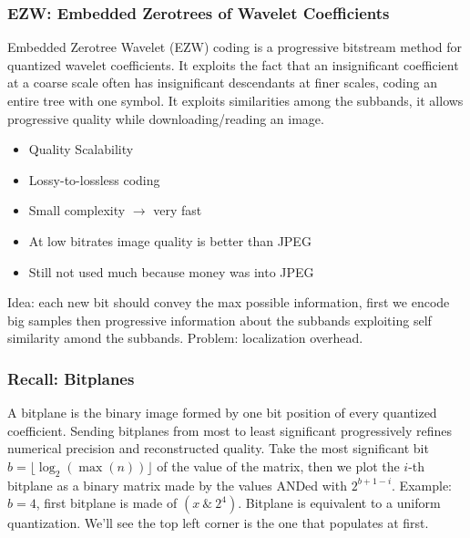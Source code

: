 \subsubsection{EZW: Embedded Zerotrees of Wavelet Coefficients}
Embedded Zerotree Wavelet (EZW) coding is a progressive bitstream method for quantized wavelet coefficients. It exploits the fact that an insignificant coefficient at a coarse scale often has insignificant descendants at finer scales, coding an entire tree with one symbol.
It exploits similarities among the subbands, it allows progressive quality while downloading/reading an image.
\begin{itemize}
    \item Quality Scalability
    \item Lossy-to-lossless coding
    \item Small complexity $\to$ very fast
    \item At low bitrates image quality is better than JPEG
    \item Still not used much because money was into JPEG
\end{itemize}
Idea: each new bit should convey the max possible information, first we encode big samples then progressive information about the subbands exploiting self similarity amond the subbands. Problem: localization overhead.
\subsubsection{Recall: Bitplanes}
A bitplane is the binary image formed by one bit position of every quantized coefficient. Sending bitplanes from most to least significant progressively refines numerical precision and reconstructed quality.
Take the most significant bit $ b = \lfloor \log_2(\max(n))\rfloor$ of the value of the matrix, then we plot the $i$-th bitplane as a binary matrix made by the values ANDed with $2^{b+1-i}$. Example: $b=4$, first bitplane is made of $(x\ \&\  2^4)$.
Bitplane is equivalent to a uniform quantization. We'll see the top left corner is the one that populates at first.
